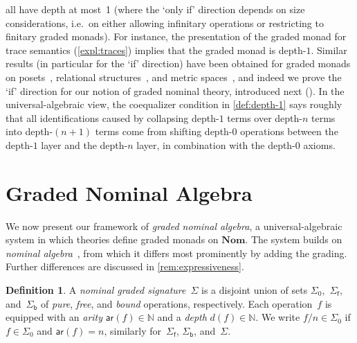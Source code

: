 \documentclass[11pt,a4paper]{amsart}
\newcommand{\sigp}{\Sigma_0}
\newcommand{\sigf}{\Sigma_{\mathsf f}}
\newcommand{\sigb}{\Sigma_{\mathsf b}}
\newcommand{\ar}{\mathsf{ar}}
\theoremstyle{plain}
\numberwithin{equation}{section}
\newcommand{\Nat}{{\mathbb{N}}}
\newcommand{\+}[1]{\mathcal{#1}\xspace}
\newcommand{\Nom}{\mathbf{Nom}}
\theoremstyle{definition}
\newtheorem{defn}[defn]{Definition}
\begin{document}
all have depth at most~1 \cite[Proposition~7.3]{MiliusEA15} (where the
`only if' direction depends on size considerations, i.e.~on either
allowing infinitary operations or restricting to finitary graded
monads). For instance, the presentation of the graded monad for trace
semantics (\cref{expl:traces}) implies that the graded monad is
depth-$1$. Similar results (in particular for the `if' direction) have
been obtained for graded monads on posets~\cite{FordEA21}, relational
structures~\cite{FordThesis}, and metric spaces~\cite{ForsterEA25a},
and indeed we prove the `if' direction for our notion of graded
nominal theory, introduced next (). In the
universal-algebraic view, the coequalizer condition in
\cref{def:depth-1} says roughly that all identifications caused by
collapsing depth-$1$ terms over depth-$n$ terms into depth-$(n+1)$
terms come from shifting depth-$0$ operations between the depth-$1$
layer and the depth-$n$ layer, in combination with the depth-$0$
axioms.

\section{Graded Nominal Algebra}\label{sec:graded-algebra}

\noindent We now present our framework of \emph{graded nominal
  algebra}, a universal-algebraic system in which theories define
graded monads on $\Nom$. The system builds on \emph{nominal
  algebra}~\cite{Gabbay09,GabbayMathijssen09}, from which it differs
most prominently by adding the grading.  Further differences are
discussed in \cref{rem:expressiveness}.

\begin{defn}
  A \emph{nominal graded signature}~\(\Sigma\) is a disjoint union of
  sets $\sigp$,~$\sigf$, and~$\sigb$ of \emph{pure}, \emph{free}, and
  \emph{bound} operations, respectively. Each operation~$f$ is
  equipped with an \emph{arity} \(\ar(f) \in \Nat\) and a \emph{depth}
  \(d(f) \in \Nat\).  We write \(f/n \in \sigp\) if \(f \in \sigp\)
  and \(\ar(f) = n\), similarly for~\(\sigf\), \(\sigb\),
  and~$\Sigma$.
\end{defn}
\end{document}
